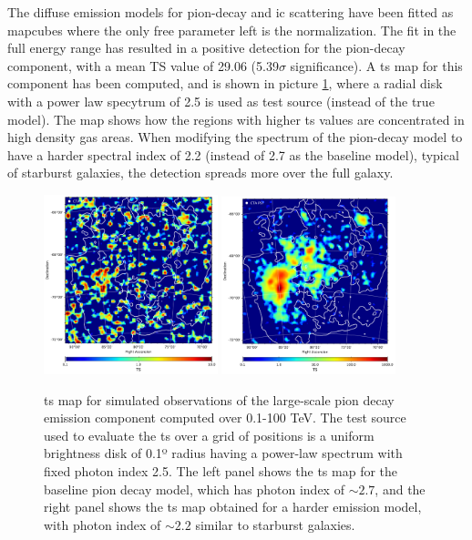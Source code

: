 \documentclass[main.tex]{subfiles}
\begin{document}
The diffuse emission models for pion-decay and \gls{ic} scattering have been fitted as mapcubes where the only free parameter left is the normalization. The fit in the full energy range has resulted in a positive detection for the pion-decay component, with a mean TS value of 29.06 (5.39$\sigma$ significance). A \gls{ts} map for this component has been computed, and is shown in picture \ref{fig:res:pion-tsmap}, where a radial disk with a power law specytrum of 2.5 is used as test source (instead of the true model). The map shows how the regions with higher \gls{ts} values are concentrated in high density gas areas. When modifying the spectrum of the pion-decay model to have a harder spectral index of 2.2 (instead of 2.7 as the baseline model), typical of starburst galaxies, the detection spreads more over the full galaxy.

\begin{figure}[h!]
  \begin{center}
    \includegraphics[width=0.45\textwidth]{Pictures/TSmap_Pion_radialdisk010.pdf}
    \includegraphics[width=0.45\textwidth]{Pictures/TSmap_Pion-PLidx050_radialdisk010.pdf}
    \caption{\gls{ts} map for simulated observations of the large-scale pion decay emission component computed over 0.1-100 TeV. The test source used to evaluate the \gls{ts} over a grid of positions is a uniform brightness disk of 0.1º radius having a power-law spectrum with fixed photon index 2.5. The left panel shows the \gls{ts} map for the baseline pion decay model, which has photon index of $\sim 2.7$, and the right panel shows the \gls{ts} map obtained for a harder emission model, with photon index of $\sim 2.2$ similar to starburst galaxies.}
    \label{fig:res:pion-tsmap}
  \end{center}
\end{figure}
\end{document}
